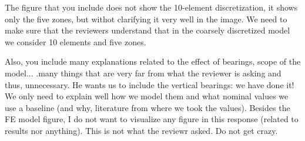 \documentclass[11pt]{article}
\begin{document}
The figure that you include does not show the 10-element discretization, it shows only the five zones, but withot clarifying it very well in the image. We need to make sure that the reviewers understand that in the coarsely discretized model we consider 10 elements and five zones. 

Also, you include many explanations related  to the effect of bearings, scope of the model... .many things that are very far from what the reviewer is asking and thus, unnecessary. He wants us to include the vertical bearings: we have done it! We only need to explain well how we model them and what nominal values we use a baseline (and why, literature from where we took the values). 
Besides the FE model figure, I do not want to visualize any figure in this response (related to results nor anything). This is not what the reviewr asked. Do not get crazy. 
\end{document}
